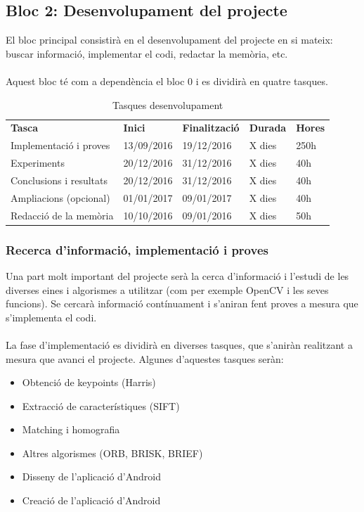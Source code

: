 	\subsection{Bloc 2: Desenvolupament del projecte}
			El bloc principal consistirà en el desenvolupament del projecte en si mateix: buscar informació, implementar el codi, redactar la memòria, etc.\\\\
			Aquest bloc té com a dependència el bloc 0 i es dividirà en quatre tasques.\\
			\begin{table}[H]
				\begin{center}
					\begin{tabular}{p{5cm} !{\vrule width -1pt}x{2.1cm} !{\vrule width -1pt}x{2.4cm} !{\vrule width -1pt}x{1.6cm} !{\vrule width -1pt}x{1.6cm}}
					\textbf{Tasca} & \textbf{Inici} & \textbf{Finalització} & \textbf{Durada} & \textbf{Hores} \\
					Implementació i proves & 13/09/2016 & 19/12/2016 & X dies & 250h \\ %
					Experiments & 20/12/2016 & 31/12/2016 & X dies & 40h \\
					Conclusions i resultats & 20/12/2016 & 31/12/2016 & X dies & 40h \\
					Ampliacions (opcional) & 01/01/2017 & 09/01/2017 & X dies & 40h \\
					Redacció de la memòria & 10/10/2016 & 09/01/2016 & X dies & 50h \\
					\end{tabular}
				\end{center}
				\caption{Tasques desenvolupament}
			\end{table}

		\subsubsection{Recerca d'informació, implementació i proves}
			Una part molt important del projecte serà la cerca d'informació i l'estudi de les diverses eines i algorismes a utilitzar (com per exemple OpenCV i les seves funcions).
			Se cercarà informació contínuament i s'aniran fent proves a mesura que s'implementa el codi.\\\\
			La fase d'implementació es dividirà en diverses tasques, que s'aniràn realitzant a mesura que avanci el projecte. Algunes d'aquestes tasques seràn:
			\begin{itemize}
				\item{Obtenció de keypoints (Harris)}
				\item{Extracció de característiques (SIFT)}
				\item{Matching i homografia}
				\item{Altres algorismes (ORB, BRISK, BRIEF)}
				\item{Disseny de l'aplicació d'Android}
				\item{Creació de l'aplicació d'Android}
			\end{itemize}
